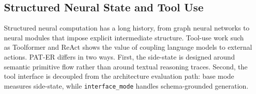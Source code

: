 \subsection{Structured Neural State and Tool Use}

Structured neural computation has a long history, from graph neural networks
\citep{scarselli2009gnn} to neural modules that impose explicit intermediate
structure. Tool-use work such as Toolformer \citep{schick2023toolformer} and
ReAct \citep{yao2023react} shows the value of coupling language models to
external actions. PAT-ER differs in two ways. First, the side-state is designed
around semantic primitive flow rather than around textual reasoning traces.
Second, the tool interface is decoupled from the architecture evaluation path:
base mode measures side-state, while \texttt{interface\_mode} handles
schema-grounded generation.
